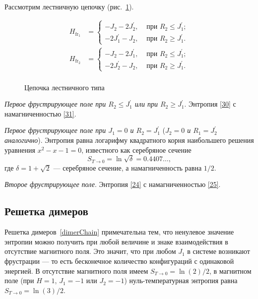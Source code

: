 Рассмотрим лестничную цепочку (рис.~\ref{ladderChain}). 

\[
\begin{aligned}
H_{\text{fr}_1}&=
\begin{cases}
-J_{2}-2J_{2}^{'}, & \text{ при } R_{2}\leq J_{1}^{'}; \\
-2J_{1}^{'}-J_{2}, & \text{ при } R_{2}\ge J_{1}^{'}.
\end{cases}\\
H_{\text{fr}_2}&=
\begin{cases}
-J_{2}-2J_{1}^{'}, & \text{ при } R_{2}\leq J_{1}^{'}; \\
-2J_{2}^{'}-J_{2}, & \text{ при } R_{2}\ge J_{1}^{'}.
\end{cases}\\
\end{aligned}
\]

 \begin{figure}[h]
 	\caption{Цепочка лестничного типа}
 	\label{ladderChain}
 \end{figure}

\emph{Первое фрустрирующее поле при $R_{2}\leq J_{1}^{'}$ или при $R_{2}\ge J_{1}^{'}$}. Энтропия \eqref{30} с намагниченностью \eqref{31}.

\emph{Первое фрустрирующее поле при $J_1 = 0$ и $R_2 = J_1^{'}$} (\emph{$J_2 = 0$ и $R_1 = J_2^{'}$ аналогично}). Энтропия равна логарифму квадратного корня наибольшего решения уравнения \mbox{$x^2-x-1=0$}, известного как серебряное сечение
\begin{equation}
S_{T\rightarrow 0} = \ln \sqrt{\delta} = 0.4407\dots, 
\label{40}
\end{equation}
где $\delta = 1 + \sqrt{2}$ --- серебряное сечение, а намагниченность равна $1/2$.

\emph{Второе фрустрирующее поле}. Энтропия \eqref{24} с намагниченностью \eqref{25}.

\subsection{Решетка димеров}

Решетка димеров~\ref{dimerChain} примечательна тем, что ненулевое значение энтропии можно получить при любой величине и знаке взаимодействия в отсутствие магнитного поля. Это значит, что при любом $J_1$ в системе возникают фрустрации --- то есть бесконечное количество конфигураций с одинаковой энергией. В отсутствие магнитного поля имеем $S_{T\rightarrow 0} = \ln(2)/2$, в магнитном поле (при $H = 1$, $J_1 = −1$ или $J_2 = −1$) нуль-температурная энтропия равна $S_{T\rightarrow 0} = \ln(3)/2$.

